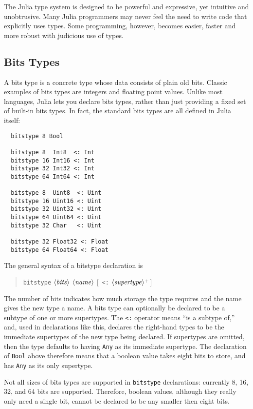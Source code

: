 \documentclass{article}
\renewcommand{\sec}[1]{\label{sec:#1}}
\newcommand{\placeholder}[1]{$\left<\text{\emph{#1}}\right>$}
\begin{document}
\begin{itemize}
\end{itemize}
The Julia type system is designed to be powerful and expressive, yet intuitive and unobtrusive.
Many Julia programmers may never feel the need to write code that explicitly uses types.
Some programming, however, becomes easier, faster and more robust with judicious use of types.

\subsection{Bits Types}\sec{bits-types}

A bits type is a concrete type whose data consists of plain old bits.
Classic examples of bits types are integers and floating point values.
Unlike most languages, Julia lets you declare bits types, rather than just providing a fixed set of built-in bits types.
In fact, the standard bits types are all defined in Julia itself:
\begin{verbatim}
  bitstype 8 Bool

  bitstype 8  Int8  <: Int
  bitstype 16 Int16 <: Int
  bitstype 32 Int32 <: Int
  bitstype 64 Int64 <: Int

  bitstype 8  Uint8  <: Uint
  bitstype 16 Uint16 <: Uint
  bitstype 32 Uint32 <: Uint
  bitstype 64 Uint64 <: Uint
  bitstype 32 Char   <: Uint

  bitstype 32 Float32 <: Float
  bitstype 64 Float64 <: Float
\end{verbatim}
The general syntax of a bitstype declaration is
\begin{quote}
  \verb|bitstype| \placeholder{bits} \placeholder{name} [~\verb|<:| \placeholder{supertype}\:[\verb|,|\,\placeholder{supertype}\,]$^+$\,]
\end{quote}
The number of bits indicates how much storage the type requires and the name gives the new type a name.
A bits type can optionally be declared to be a subtype of one or more supertypes.
The \verb|<:| operator means ``is a subtype of,'' and, used in declarations like this, declares the right-hand types to be the immediate supertypes of the new type being declared.
If supertypes are omitted, then the type defaults to having \verb|Any| as its immediate supertype.
The declaration of \verb|Bool| above therefore means that a boolean value takes eight bits to store, and has \verb|Any| as its only supertype.

Not all sizes of bits types are supported in \verb|bitstype| declarations:
currently 8, 16, 32, and 64 bits are supported.
Therefore, boolean values, although they really only need a single bit, cannot be declared to be any smaller then eight bits.
\end{document}
